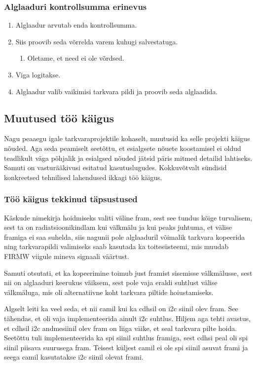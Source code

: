 \documentclass[12pt,a4paper]{article}
\begin{document}
\subsubsection{Alglaaduri kontrollsumma erinevus}
\begin{enumerate}
	\item Alglaadur arvutab enda kontrollsumma.
	\item Siis proovib seda võrrelda varem kuhugi salvestatuga.
		\begin{enumerate}
		\item Oletame, et need ei ole võrdsed.
		\end{enumerate}
	\item Viga logitakse.
	\item Alglaadur valib vaikimisi tarkvara pildi ja proovib seda alglaadida.
\end{enumerate}

\subsection{Muutused töö käigus}
Nagu peaaegu igale tarkvaraprojektile kohaselt, muutusid ka selle projekti
käigus nõuded. Aga seda peamiselt seetõttu, et esialgsete nõuete koostamisel ei
oldud teadlikult väga põhjalik ja esialgsed nõuded jätsid päris mitmed
detailid lahtiseks. Samuti on vasturääkivusi esitatud kasutuslugudes.
Kokkuvõtvalt sündisid konkreetsed tehnilised lahendused ikkagi töö käigus.

\subsubsection{Töö käigus tekkinud täpsustused}
Käskude nimekirja hoidmiseks valiti väline \gls{fram}, sest see tundus kõige
turvalisem, sest ta on radiatsioonikindlam kui välkmälu ja kui peaks juhtuma, et
välise \gls{fram}iga ei saa suhelda, siis nagunii pole alglaaduril võimalik
tarkvara kopeerida ning tarkvarapildi valimiseks saab kasutada ka toitesüsteemi,
mis muudab FIRMW viigule mineva signaali väärtust.

Samuti otsutati, et ka kopeerimine toimub just \gls{fram}ist sisemisse
välkmälusse, sest nii on alglaaduri keerukus väiksem, sest pole vaja eraldi
suhtlust välise välkmäluga, mis oli alternatiivne koht tarkvara piltide
hoiustamiseks.

Algselt leiti ka veel seda, et nii \gls{cam}il kui ka \gls{cdhs}il on \gls{i2c}
siinil olev \gls{fram}.  See tähendas, et oli vaja implementeerida ainult
\gls{i2c} suhtlus. Hiljem aga tehti avastus, et \gls{cdhs}il \gls{i2c}
andmesiinil olev \gls{fram} on liiga väike, et seal tarkvara pilte hoida.
Seetõttu tuli implementeerida ka \gls{spi} siinil suhtlus \gls{fram}iga, sest
\gls{cdhs}i peal oli \gls{spi} siinil piisava suurusega \gls{fram}. Teisest
küljest \gls{cam}il ei ole \gls{spi} siinil asuvat \gls{fram}i ja seega
\gls{cam}il kasutatakse \gls{i2c} siinil olevat \gls{fram}i.
\end{document}
